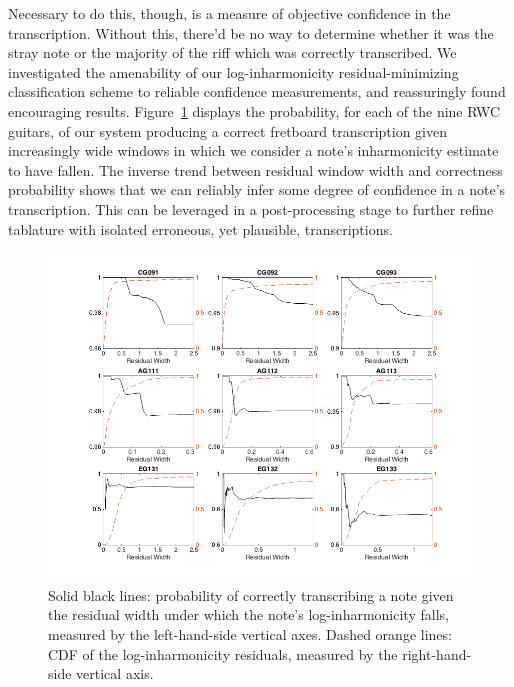 \documentclass[12pt]{cmuthesis}
\begin{document}
Necessary to do this, though, is a measure of objective confidence in the transcription. Without this, there'd be no way to determine whether it was the stray note or the majority of the riff which was correctly transcribed. We investigated the amenability of our log-inharmonicity residual-minimizing classification scheme to reliable confidence measurements, and reassuringly found encouraging results. Figure~\ref{fig:p-correct-res} displays the probability, for each of the nine RWC guitars, of our system producing a correct fretboard transcription given increasingly wide windows in which we consider a note's inharmonicity estimate to have fallen. The inverse trend between residual window width and correctness probability shows that we can reliably infer some degree of confidence in a note's transcription. This can be leveraged in a post-processing stage to further refine tablature with isolated erroneous, yet plausible, transcriptions.
\begin{figure}[!htbp] 
\label{fig:p-correct-res}
\centering
\includegraphics[angle=90,scale=0.65]{p-correct-res}
\caption{Solid black lines: probability of correctly transcribing a note given the residual width under which the note's log-inharmonicity falls, measured by the left-hand-side vertical axes. Dashed orange lines: CDF of the log-inharmonicity residuals, measured by the right-hand-side vertical axis.}
\end{figure} 
\end{document}
